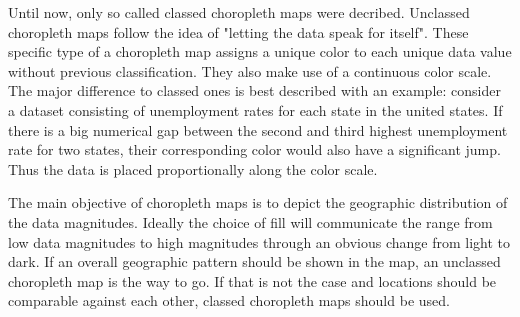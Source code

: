 Until now, only so called classed choropleth maps were decribed. Unclassed choropleth maps follow the idea of "letting the data speak for itself". These specific type of a choropleth map assigns a unique color to each unique data value without previous classification. They also make use of a continuous color scale. The major difference to classed ones is best described with an example: consider a dataset consisting of unemployment rates for each state in the united states. If there is a big numerical gap between the second and third highest unemployment rate for two states, their corresponding color would also have a significant jump. Thus the data is placed proportionally along the color scale.

The main objective of choropleth maps is to depict the geographic distribution of the data magnitudes. Ideally the choice of fill will communicate the range from low data magnitudes to high magnitudes through an obvious change from light to dark. If an overall geographic pattern should be shown in the map, an unclassed choropleth map is the way to go. If that is not the case and locations should be comparable against each other, classed choropleth maps should be used.


